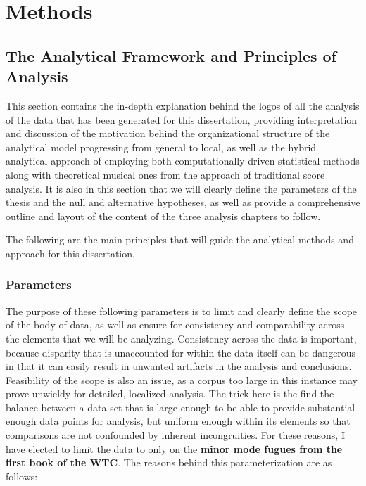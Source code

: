     
    
    

    \hypertarget{Methods}{\chapter{Methods}\label{Methods}}
    \section{The Analytical Framework and Principles of
Analysis}\label{the-analytical-framework-and-principles-of-analysis}

    This section contains the in-depth explanation behind the logos of all
the analysis of the data that has been generated for this dissertation,
providing interpretation and discussion of the motivation behind the
organizational structure of the analytical model progressing from
general to local, as well as the hybrid analytical approach of employing
both computationally driven statistical methods along with theoretical
musical ones from the approach of traditional score analysis. It is also
in this section that we will clearly define the parameters of the thesis
and the null and alternative hypotheses, as well as provide a
comprehensive outline and layout of the content of the three analysis
chapters to follow.

The following are the main principles that will guide the analytical
methods and approach for this dissertation.

    \subsection{Parameters}\label{parameters}

The purpose of these following parameters is to limit and clearly define
the scope of the body of data, as well as ensure for consistency and
comparability across the elements that we will be analyzing. Consistency
across the data is important, because disparity that is unaccounted for
within the data itself can be dangerous in that it can easily result in
unwanted artifacts in the analysis and conclusions. Feasibility of the
scope is also an issue, as a corpus too large in this instance may prove
unwieldy for detailed, localized analysis. The trick here is the find
the balance between a data set that is large enough to be able to
provide substantial enough data points for analysis, but uniform enough
within its elements so that comparisons are not confounded by inherent
incongruities. For these reasons, I have elected to limit the data to
only on the \textbf{minor mode fugues from the first book of the WTC}.
The reasons behind this parameterization are as follows:

